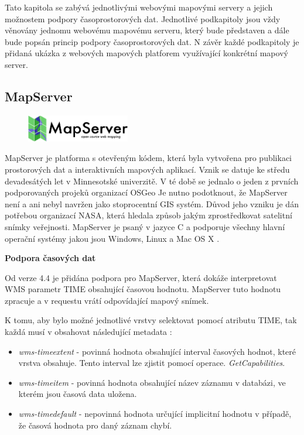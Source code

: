  Tato kapitola se zabývá jednotlivými webovými mapovými servery a jejich možnostem podpory časoprostorových dat. Jednotlivé podkapitoly jsou vždy věnovány jednomu webovému mapovému serveru, který bude představen a dále bude popsán princip podpory časoprostorových dat. N závěr každé podkapitoly je přidaná ukázka z webových mapových platforem využívající konkrétní mapový server.

\subsection{MapServer}

\begin{figure}[h!]
	\centering
	\includegraphics[width=0.4\textwidth]{../img/mapserver-logo.png}
	\label{fig:mapserver-logo}
\end{figure}
\bigskip

MapServer je platforma s otevřeným kódem, která byla vytvořena pro publikaci prostorových dat a interaktivních mapových aplikací. Vznik se datuje ke středu devadesátých let v Minnesotské univerzitě. V té době se jednalo o jeden z prvních podporovaných projeků organizací OSGeo Je nutno podotknout, že MapServer není a ani nebyl navržen jako stoprocentní GIS systém. Důvod jeho vzniku je dán potřebou organizací NASA, která hledala způsob jakým zprostředkovat satelitní snímky veřejnosti. MapServer je psaný v jazyce C a podporuje všechny hlavní operační systémy jakou jsou Windows, Linux a Mac OS X \cite{mapserver_about}.

\bigskip
\noindent
\textbf{Podpora časových dat}

Od verze 4.4 je přidána podpora pro MapServer, která dokáže interpretovat WMS parametr TIME obsahující časovou hodnotu. MapServer tuto hodnotu zpracuje a v requestu vrátí odpovídající mapový snímek. 

K tomu, aby bylo možné jednotlivé vrstvy selektovat pomocí atributu TIME, tak každá musí v obsahovat následující metadata \cite{mapserver_about}:

\begin{itemize}
	\item\textit{wms-timeextent} - povinná hodnota obsahující interval časových hodnot, které vrstva obsahuje. Tento interval lze zjistit pomocí operace. \textit{GetCapabilities}.
	\item\textit{wms-timeitem} - povinná hodnota obsahující název záznamu v databázi, ve kterém jsou časová data uložena.  
	\item\textit{wms-timedefault} - nepovinná hodnota určující implicitní hodnotu v případě, že časová hodnota pro daný záznam chybí.   
\end{itemize}

